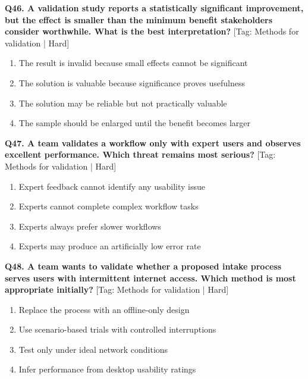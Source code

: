 \noindent\textbf{Q46. A validation study reports a statistically significant improvement, but the effect is smaller than the minimum benefit stakeholders consider worthwhile. What is the best interpretation?} \hfill [Tag: Methods for validation | Hard]
\begin{enumerate}[label=(\alph*),topsep=2pt,itemsep=1pt,partopsep=0pt,parsep=0pt]
    \item {The result is invalid because small effects cannot be significant}
    \item {The solution is valuable because significance proves usefulness}
    \item {The solution may be reliable but not practically valuable}
    \item {The sample should be enlarged until the benefit becomes larger}
\end{enumerate}
\vspace{2mm}

\noindent\textbf{Q47. A team validates a workflow only with expert users and observes excellent performance. Which threat remains most serious?} \hfill [Tag: Methods for validation | Hard]
\begin{enumerate}[label=(\alph*),topsep=2pt,itemsep=1pt,partopsep=0pt,parsep=0pt]
    \item {Expert feedback cannot identify any usability issue}
    \item {Experts cannot complete complex workflow tasks}
    \item {Experts always prefer slower workflows}
    \item {Experts may produce an artificially low error rate}
\end{enumerate}
\vspace{2mm}

\noindent\textbf{Q48. A team wants to validate whether a proposed intake process serves users with intermittent internet access. Which method is most appropriate initially?} \hfill [Tag: Methods for validation | Hard]
\begin{enumerate}[label=(\alph*),topsep=2pt,itemsep=1pt,partopsep=0pt,parsep=0pt]
    \item {Replace the process with an offline-only design}
    \item {Use scenario-based trials with controlled interruptions}
    \item {Test only under ideal network conditions}
    \item {Infer performance from desktop usability ratings}
\end{enumerate}
\vspace{2mm}

